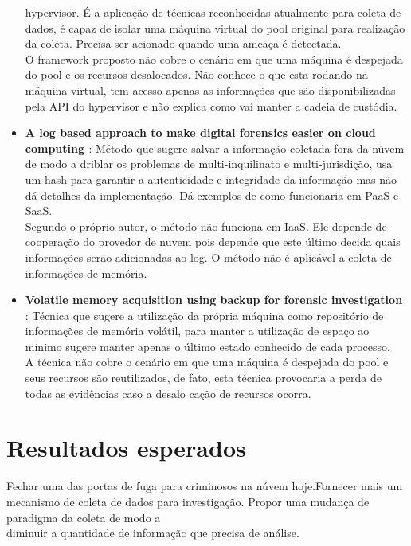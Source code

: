 \documentclass[12pt,				%
	openright,			%
	oneside,			%
	a4paper,			%
	english,			%
	brazil				%
	]{abntex2}
\begin{document}
\begin{itemize}
 hypervisor. É a aplicação de técnicas reconhecidas atualmente para coleta de dados, é capaz de isolar uma máquina virtual do pool original para realização da coleta. Precisa 
 ser acionado quando uma ameaça é detectada.\\
 O framework proposto não cobre o cenário em que uma máquina é despejada do pool e os recursos desalocados. Não conhece o que esta rodando na máquina virtual, tem acesso apenas as
 informações que são disponibilizadas pela API do hypervisor e não explica como vai manter a cadeia de custódia.
 \item \textbf{A log based approach to make digital forensics easier on cloud computing \cite{Sang2013} }: Método que sugere salvar a informação coletada fora da núvem de modo a driblar
 os problemas de multi-inquilinato e multi-jurisdição, usa um hash para garantir a autenticidade e integridade da informação mas não dá detalhes da implementação. Dá exemplos de
 como funcionaria em PaaS e SaaS.\\
 Segundo o próprio autor, o método não funciona em IaaS. Ele depende de cooperação do provedor de nuvem pois depende que este último decida quais informações serão adicionadas ao log.
 O método não é aplicável a coleta de informações de memória.
\item \textbf{Volatile memory acquisition using backup for forensic investigation \cite{Dezfouli2012} }: Técnica que sugere a utilização da própria máquina
como repositório de informações de memória volátil, para manter a utilização de espaço ao mínimo sugere manter apenas o último estado conhecido de cada processo.\\
A técnica não cobre o cenário em que uma máquina é despejada do pool e seus recursos são reutilizados, de fato, esta técnica provocaria a perda de todas as evidências caso a desalo
cação de recursos ocorra.
\end{itemize}

\chapter{Resultados esperados} \label{chap:result}
Fechar uma das portas de fuga para criminosos na núvem hoje.Fornecer mais um mecanismo de coleta de dados para investigação. Propor uma mudança de paradigma da coleta de modo a \\
diminuir a quantidade de informação que precisa de análise.



\postextual

%  

\begin{comment}
\printindex
\end{comment}

\end{document}
